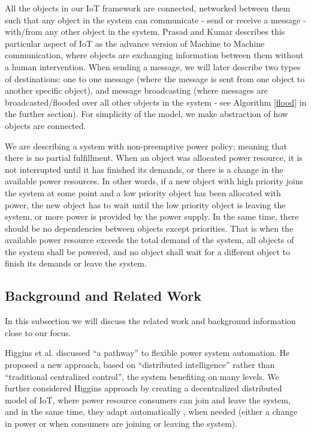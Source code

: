 \documentclass[../main/IoT.tex]{subfiles}
\begin{document}
All the objects in our IoT framework are connected, networked between them such that any object in the system can communicate - send or receive a message - with/from any other object in the system. Prasad and Kumar \cite{prasad2012energy} describes this particular aspect of IoT as the advance version of Machine to Machine communication, where objects are exchanging information between them without a human intervention. When sending a message, we will later describe two types of destinations: one to one message (where the message is sent from one object to another specific object), and message broadcasting (where messages are broadcasted/flooded over all other objects in the system - see Algorithm \ref{flood} in the further section). For simplicity of the model, we make abstraction of how objects are connected.

We are describing a system with non-preemptive power policy; meaning that there is no partial fulfillment. When an object was allocated power resource, it is not interrupted until it has finished its demands, or there is a change in the available power resources. In other words, if a new object with high priority joins the system at some point and a low priority object has been allocated with power, the new object has to wait until the low priority object is leaving the system, or more power is provided by the power supply. In the same time, there should be no dependencies between objects except priorities. That is when the available power resource exceeds the total demand of the system, all objects of the system shall be powered, and no object shall wait for a different object to finish its demands or leave the system.

\subsection{Background and Related Work}

In this subsection we will discuss the related work and background information close to our focus.

Higgins et al. \cite{higgins2011distributed} discussed ``a pathway'' to flexible power system automation. He proposed a new approach, based on ``distributed intelligence'' rather than ``traditional centralized control'', the system benefiting on many levels. We further considered Higgins approach by creating a decentralized distributed model of IoT, where power resource consumers can join and leave the system, and in the same time, they adapt automatically \cite{bookIoT}, when needed (either a change in power or when consumers are joining or leaving the system).
\end{document}
